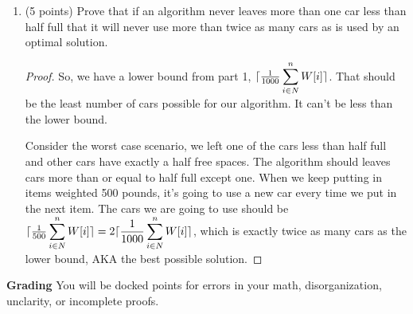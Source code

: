 \documentclass[paper=a4, fontsize=11pt]{scrartcl}
\DeclarePairedDelimiter\ceil{\lceil}{\rceil}
\numberwithin{equation}{section}		%
\numberwithin{figure}{section}			%
\numberwithin{table}{section}				%
\begin{document}
\begin{enumerate}
\item (5 points) Prove that if an algorithm never leaves more than one car less than half full that it will never use more than twice as many cars as is used by an optimal solution.
\begin{proof}
	So, we have a lower bound from part 1, $\ceil{\frac{1}{1000} \displaystyle\sum_{i\in N}^n W[i]}$. That should be the least number of cars possible for our algorithm. It can't be less than the lower bound. 
	
	Consider the worst case scenario, we left one of the cars less than half full and other cars have exactly a half free spaces. The algorithm should leaves cars more than or equal to half full except one. When we keep putting in items weighted 500 pounds, it's going to use a new car every time we put in the next item. The cars we are going to use should be $\ceil{\frac{1}{500} \displaystyle\sum_{i\in N}^n W[i]} = 
	2\ceil{\frac{1}{1000} \displaystyle\sum_{i\in N}^n W[i]}$, which is exactly twice as many cars as the lower bound, AKA the best possible solution.
	
\end{proof}



\end{enumerate}

\noindent\textbf{Grading} You will be docked points for errors in your math, disorganization, unclarity, or incomplete proofs. 
\end{document}
